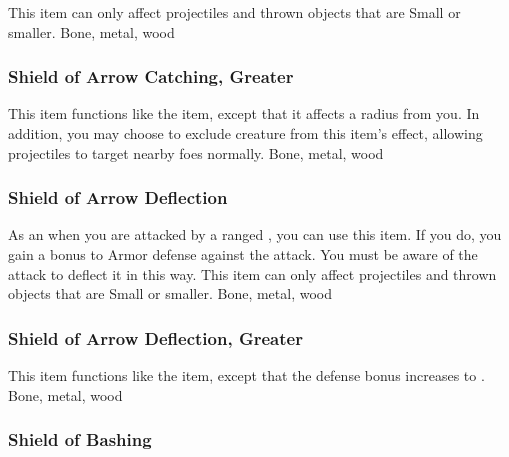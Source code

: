 This item can only affect projectiles and thrown objects that are Small or smaller.
 
 Bone, metal, wood
\lowercase{\hypertarget{item:Shield of Arrow Catching, Greater}{}}\label{item:Shield of Arrow Catching, Greater}
\hypertarget{item:Shield of Arrow Catching, Greater}{\subsubsection{Shield of Arrow Catching, Greater\hfill{}}}
This item functions like the  item, except that it affects a \arealarge radius from you.
In addition, you may choose to exclude creature from this item's effect, allowing projectiles to target nearby foes normally.
 
 Bone, metal, wood
\lowercase{\hypertarget{item:Shield of Arrow Deflection}{}}\label{item:Shield of Arrow Deflection}
\hypertarget{item:Shield of Arrow Deflection}{\subsubsection{Shield of Arrow Deflection\hfill{}}}
As an  when you are attacked by a ranged , you can use this item.
If you do, you gain a  bonus to Armor defense against the attack.
You must be aware of the attack to deflect it in this way.
This item can only affect projectiles and thrown objects that are Small or smaller.
 
 Bone, metal, wood
\lowercase{\hypertarget{item:Shield of Arrow Deflection, Greater}{}}\label{item:Shield of Arrow Deflection, Greater}
\hypertarget{item:Shield of Arrow Deflection, Greater}{\subsubsection{Shield of Arrow Deflection, Greater\hfill{}}}
This item functions like the  item, except that the defense bonus increases to .
 
 Bone, metal, wood
\lowercase{\hypertarget{item:Shield of Bashing}{}}\label{item:Shield of Bashing}
\hypertarget{item:Shield of Bashing}{\subsubsection{Shield of Bashing\hfill{}}}
